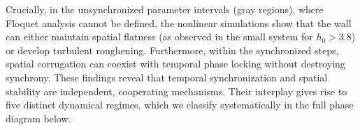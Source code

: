 \documentclass[prb,aps,twocolumn,superscriptaddress,floatfix]{revtex4-1}
\begin{document}
{{Crucially, in the unsynchronized parameter intervals (gray regions), where Floquet analysis cannot be defined, the nonlinear simulations show that the wall can either maintain spatial flatness (as observed in the small system for $h_0 > 3.8$) or develop turbulent roughening. Furthermore, within the synchronized steps, spatial corrugation can coexist with temporal phase locking without destroying synchrony. 
These findings reveal that temporal synchronization and spatial stability are independent, cooperating mechanisms. Their interplay gives rise to five distinct dynamical regimes, which we classify systematically in the full phase diagram below.
}




}
\end{document}
